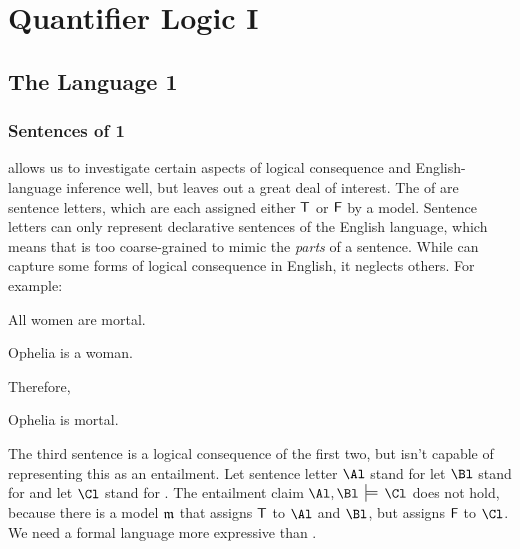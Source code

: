 
\chapter{Quantifier Logic I}\label{quantifierlogic1}

\section{The Language \GQL{}1}


\subsection{Sentences of \GQL{}1}\label{Sec:GQLSymbols1}
\GSL{} allows us to investigate certain aspects of logical consequence and English-language inference well, but leaves out a great deal of interest.  The  of \GSL{} are sentence letters, which are each assigned either $\mathsf{T}$ or $\mathsf{F}$ by a model.  Sentence letters can only represent declarative sentences of the English language, which means that \GSL{} is too coarse-grained to mimic the \emph{parts} of a sentence.  While \GSL{} can capture some forms of logical consequence in English, it neglects others.  For example:

\begin{RESTARTmenumerate}
\item All women are mortal.
\item Ophelia is a woman.

Therefore,

\item Ophelia is mortal.
\end{RESTARTmenumerate}

\noindent{}The third sentence is a logical consequence of the first two, but \GSL{} isn't capable of representing this as an entailment.  Let sentence letter $\Al$ stand for  let $\Bl$ stand for  and let $\Cl$ stand for .  
The entailment claim $\Al, \Bl \:\sdtstile{}{}\: \Cl$ does not hold, because there is a model $\mathfrak{m}$ that assigns $\mathsf{T}$ to $\Al$ and $\Bl$, but assigns $\mathsf{F}$ to $\Cl$.  We need a formal language more expressive than \GSL{}.

